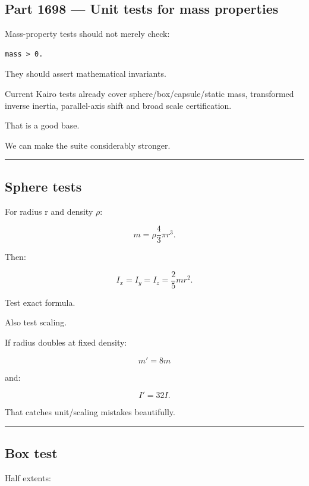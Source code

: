 \subsection{Part 1698 --- Unit tests for mass properties}\label{06-engine-ii-ch039-part-1698-unit-tests-for-mass-properties}

Mass-property tests should not merely check:

\begin{verbatim}
mass > 0.
\end{verbatim}

They should assert mathematical invariants.

Current Kairo tests already cover sphere/box/capsule/static mass, transformed inverse inertia, parallel-axis shift and broad scale certification.

That is a good base.

We can make the suite considerably stronger.

\begin{center}\rule{0.5\linewidth}{0.5pt}\end{center}

\subsection{Sphere tests}\label{06-engine-ii-ch039-sphere-tests}

For radius r and density \(\rho\):

\[
m
=
\rho
\frac43\pi r^3.
\]

Then:

\[
I_x=I_y=I_z
=
\frac25mr^2.
\]

Test exact formula.

Also test scaling.

If radius doubles at fixed density:

\[
m'=
8m
\]

and:

\[
I'=
32I.
\]

That catches unit/scaling mistakes beautifully.

\begin{center}\rule{0.5\linewidth}{0.5pt}\end{center}

\subsection{Box test}\label{06-engine-ii-ch039-box-test}

Half extents:

